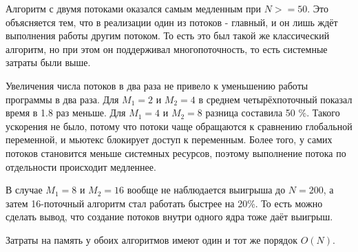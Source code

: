 Алгоритм с двумя потоками оказался самым медленным при $N >=50$. Это объясняется тем, что в реализации
один из потоков - главный, и он лишь ждёт выполнения работы другим потоком. То есть это был такой же 
классический алгоритм, но при этом он поддерживал многопоточность, то есть системные затраты были выше.

Увеличения числа потоков в два раза не привело к уменьшению работы программы в два раза. Для
$M_1 = 2$ и $M_2 = 4$ в среднем четырёхпоточный показал время в 1.8 раз меньше. Для 
$M_1 = 4$ и $M_2 = 8$ разница составила 50 \%. Такого ускорения не было, потому что потоки чаще 
обращаются к сравнению глобальной переменной, и мьютекс блокирует доступ к переменным. Более того,
у самих потоков становится меньше системных ресурсов, поэтому выполнение потока по отдельности
происходит медленнее.

В случае $M_1 = 8$ и $M_2 = 16$ вообще не наблюдается выигрыша до $N=200$, а затем 16-поточный алгоритм стал 
работать быстрее на 20\%. То есть можно сделать вывод, что создание потоков внутри одного ядра тоже даёт выигрыш.

Затраты на память у обоих алгоритмов имеют один и тот же порядок $O(N)$.